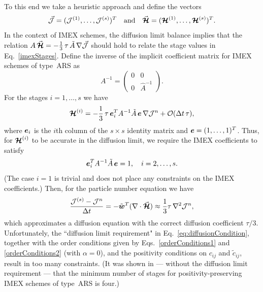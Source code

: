 To this end we take a heuristic approach and define the vectors 
\begin{equation}
  \vec{\mathcal{J}}=(\mathcal{J}^{(1)},\ldots,\mathcal{J}^{(s)})^{T}
  \quad\text{and}\quad
  \vec{\boldsymbol{\mathcal{H}}}=(\boldsymbol{\mathcal{H}}^{(1)},\ldots,\boldsymbol{\mathcal{H}}^{(s)})^{T}.  
\end{equation}
In the context of IMEX schemes, the diffusion limit balance implies that the relation $A\,\vec{\boldsymbol{\mathcal{H}}}=-\frac{1}{3}\,\tau\,\tilde{A}\,\nabla\vec{\mathcal{J}}$ should hold to relate the stage values in Eq.~\eqref{imexStages}.  
Define the inverse of the implicit coefficient matrix for IMEX schemes of type~ARS as
\begin{equation*}
    A^{-1}
    =\left(
        \begin{matrix}
          0 & 0 \\ 
          0 & \hat{A}^{-1}
        \end{matrix}
      \right).
\end{equation*}
For the stages $i=1,\ldots,s$ we have
\begin{equation}
  \boldsymbol{\mathcal{H}}^{(i)}=-\frac{1}{3}\,\tau\,\boldsymbol{e}_{i}^{T}A^{-1}\tilde{A}\,\boldsymbol{e}\,\nabla\mathcal{J}^{n}+\mathcal{O}(\Delta t\,\tau),
\end{equation}
where $\boldsymbol{e}_{i}$ is the $i$th column of the $s\times s$ identity matrix and $\boldsymbol{e}=(1,\ldots,1)^{T}$.  
Thus, for $\boldsymbol{\mathcal{H}}^{(i)}$ to be accurate in the diffusion limit, we require the IMEX coefficients to satisfy
\begin{equation}
  \boldsymbol{e}_{i}^{T}A^{-1}\tilde{A}\,\boldsymbol{e} = 1, \quad i=2,\ldots,s.
  \label{eq:diffusionCondition}
\end{equation}
(The case $i=1$ is trivial and does not place any constraints on the IMEX coefficients.)  
Then, for the particle number equation we have
\begin{equation}
  \frac{\mathcal{J}^{(s)}-\mathcal{J}^{n}}{\Delta t}
  =-\tilde{\boldsymbol{w}}^{T}(\nabla\cdot\vec{\boldsymbol{\mathcal{H}}})
  \approx\frac{1}{3}\tau\,\nabla^{2}\mathcal{J}^{n}, 
\end{equation}
which approximates a diffusion equation with the correct diffusion coefficient $\tau/3$.  
Unfortunately, the ``diffusion limit requirement" in Eq.~\eqref{eq:diffusionCondition}, together with the order conditions given by Eqs.~\eqref{orderConditions1} and \eqref{orderConditions2} (with $\alpha=0$), and the positivity conditions on $c_{ij}$ and $\tilde{c}_{ij}$, result in too many constraints.  
(It was shown in \cite{hu_etal_2018} --- without the diffusion limit requirement --- that the minimum number of stages for positivity-preserving IMEX schemes of type~ARS is four.)  
